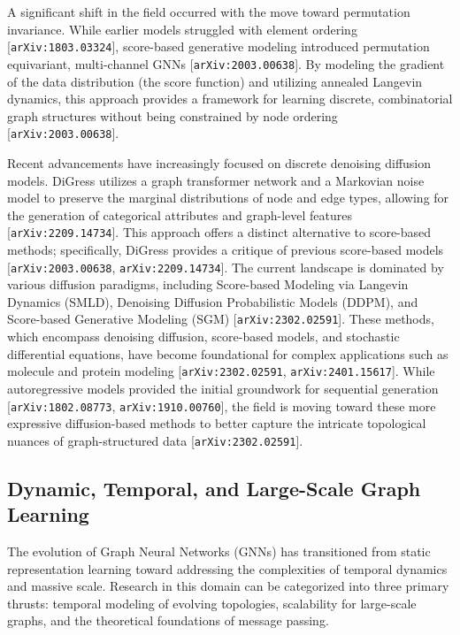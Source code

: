 \documentclass[11pt]{article}
\begin{document}
A significant shift in the field occurred with the move toward permutation invariance. While earlier models struggled with element ordering [\texttt{arXiv:1803.03324}], score-based generative modeling introduced permutation equivariant, multi-channel GNNs [\texttt{arXiv:2003.00638}]. By modeling the gradient of the data distribution (the score function) and utilizing annealed Langevin dynamics, this approach provides a framework for learning discrete, combinatorial graph structures without being constrained by node ordering [\texttt{arXiv:2003.00638}].

Recent advancements have increasingly focused on discrete denoising diffusion models. DiGress utilizes a graph transformer network and a Markovian noise model to preserve the marginal distributions of node and edge types, allowing for the generation of categorical attributes and graph-level features [\texttt{arXiv:2209.14734}]. This approach offers a distinct alternative to score-based methods; specifically, DiGress provides a critique of previous score-based models [\texttt{arXiv:2003.00638}, \texttt{arXiv:2209.14734}]. The current landscape is dominated by various diffusion paradigms, including Score-based Modeling via Langevin Dynamics (SMLD), Denoising Diffusion Probabilistic Models (DDPM), and Score-based Generative Modeling (SGM) [\texttt{arXiv:2302.02591}]. These methods, which encompass denoising diffusion, score-based models, and stochastic differential equations, have become foundational for complex applications such as molecule and protein modeling [\texttt{arXiv:2302.02591}, \texttt{arXiv:2401.15617}]. While autoregressive models provided the initial groundwork for sequential generation [\texttt{arXiv:1802.08773}, \texttt{arXiv:1910.00760}], the field is moving toward these more expressive diffusion-based methods to better capture the intricate topological nuances of graph-structured data [\texttt{arXiv:2302.02591}].

\subsection{Dynamic, Temporal, and Large-Scale Graph Learning}

The evolution of Graph Neural Networks (GNNs) has transitioned from static representation learning toward addressing the complexities of temporal dynamics and massive scale. Research in this domain can be categorized into three primary thrusts: temporal modeling of evolving topologies, scalability for large-scale graphs, and the theoretical foundations of message passing.
\end{document}

